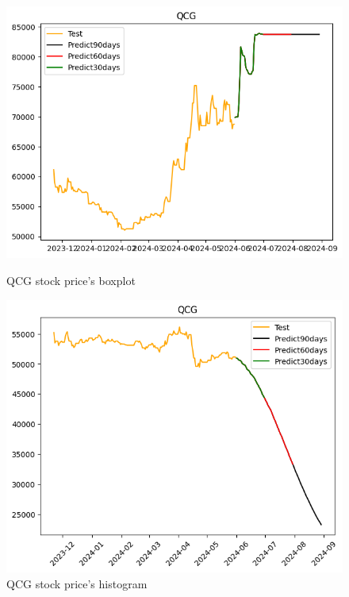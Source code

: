 \documentclass{ieeeojies}
\begin{document}
\begin{figure}[H]
  \centering
  \begin{minipage}{0.23\textwidth}
  \centering
  \includegraphics[width=1\textwidth]{bibliography/Figure/QCGRF_9-1.png}
  \caption{QCG stock price's boxplot}
  \label{fig:1}
  \end{minipage}
  \hfill
  \begin{minipage}{0.23\textwidth}
  \centering
  \includegraphics[width=1\textwidth]{bibliography/Figure/QCGRNN_9-1.png}
  \caption{QCG stock price's histogram}
  \label{fig:2}
  \end{minipage}
\end{figure}
\end{document}
